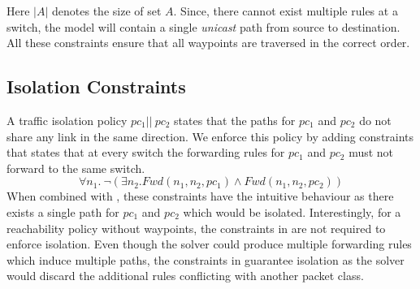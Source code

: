 Here $|A|$ denotes the size of set $A$. 
Since, there cannot exist multiple rules at a switch, the model will contain a 
single {\em unicast} path from source to destination. 
All these constraints ensure that all waypoints are traversed in the correct order. 

\subsection{Isolation Constraints}
A traffic isolation policy $pc_1 || \ pc_2$ states that the paths for
$pc_1$ and $pc_2$ do not share any link in the same direction.  We
enforce this policy by adding constraints that states that at every
switch the forwarding rules for $pc_1$ and $pc_2$ must not forward to
the same switch.
\begin{equation}
	\forall n_1.~\neg ( \exists n_2. Fwd(n_1,n_2,pc_1) \wedge Fwd(n_1,n_2,pc_2)) \label{eq:isolation}
\end{equation}
When combined with , these constraints have the intuitive behaviour 
as there exists a single path for $pc_1$ and
$pc_2$ which would be isolated. 
Interestingly, for a reachability policy without waypoints,  
the constraints in  are not required to enforce isolation. 
Even though the solver could produce multiple forwarding rules which induce multiple paths, 
the constraints in  guarantee isolation as the solver would discard
the additional rules conflicting with another packet class.



